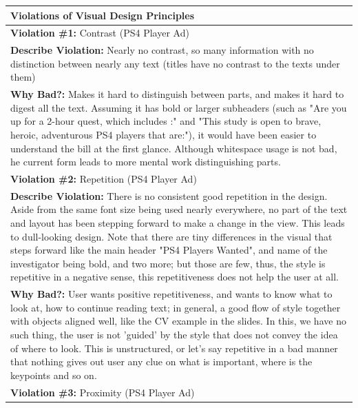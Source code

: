 \documentclass[a4paper,11pt,oneside]{scrreprt}
\begin{document}
\begin{tabularx}{\textwidth}{|X|}
	\hline
		\textbf{Violations of Visual Design Principles}
		\\
	\hline
		\textbf{Violation \#1:} Contrast (PS4 Player Ad)
		
		\\
		\textbf{Describe Violation:} Nearly no contrast, so many information with no distinction between nearly any text (titles have no contrast to the texts under them)
		
		
		\\
		\textbf{Why Bad?:} Makes it hard to distinguish between parts, and makes it hard to digest all the text. Assuming it has bold or larger subheaders (such as "Are you up for a 2-hour quest, which includes :" and "This study is open to brave, heroic, adventurous PS4 players that are:"), it would have been easier to understand the bill at the first glance. Although whitespace usage is not bad, he current form leads to more mental work distinguishing parts.
		
	\\
	\hline
	
		\textbf{Violation \#2:} Repetition (PS4 Player Ad)
		
		\\
		\textbf{Describe Violation:} There is no consistent good repetition in the design. Aside from the same font size being used nearly everywhere, no part of the text and layout has been stepping forward to make a change in the view. This leads to dull-looking design. Note that there are tiny differences in the visual that steps forward like the main header "PS4 Players Wanted", and name of the investigator being bold, and two more; but those are few, thus, the style is repetitive in a negative sense, this repetitiveness does not help the user at all. 
		
		\\
		\textbf{Why Bad?:} User wants positive repetitiveness, and wants to know what to look at, how to continue reading text; in general, a good flow of style together with objects aligned well, like the CV example in the slides. In this, we have no such thing, the user is not 'guided' by the style that does not convey the idea of where to look. This is unstructured, or let's say repetitive in a bad manner that nothing gives out user any clue on what is important, where is the keypoints and so on.
		
	\\
	\hline	
	
		\textbf{Violation \#3:} Proximity (PS4 Player Ad)
		

\end{tabularx}
\end{document}
